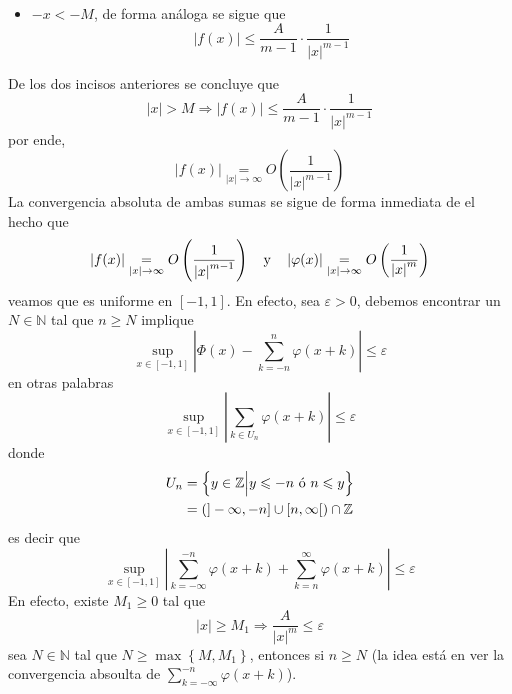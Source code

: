 \documentclass[12pt]{report}
\newcounter{it}
\theoremstyle{largebreak}
\renewcommand{\leq}{\ensuremath{\leqslant}}
\renewcommand{\geq}{\ensuremath{\geqslant}}
\newcommand\abs[1]{\ensuremath{\left|#1\right|}}
\begin{document}
\begin{sol}
\begin{itemize}
\begin{equation*}
\begin{split}
                \end{split}
            \end{equation*}
            \item $-x<-M$, de forma análoga se sigue que
            \begin{equation*}
                \abs{f(x)}\leq \frac{A}{m-1}\cdot\frac{1}{\abs{x}^{m-1}}
            \end{equation*}
        \end{itemize}
        De los dos incisos anteriores se concluye que
        \begin{equation*}
            \abs{x}>M\Rightarrow \abs{f(x)}\leq \frac{A}{m-1}\cdot\frac{1}{\abs{x}^{m-1}}
        \end{equation*}
        por ende,
        \begin{equation*}
            \abs{f(x)}\underset{\abs{x}\rightarrow\infty}{=}O\left(\frac{1}{\abs{x}^{ m-1}} \right)
        \end{equation*}
        La convergencia absoluta de ambas sumas se sigue de forma inmediata de el hecho que
        \begin{equation*}
            \abs{f(x)}\underset{\abs{x}\rightarrow\infty}{=}O\left(\frac{1}{\abs{x}^{ m-1}} \right)\quad\textup{y}\quad\abs{\varphi(x)}\underset{\abs{x}\rightarrow\infty}{=}O\left(\frac{1}{\abs{x}^{ m}} \right)
        \end{equation*}
        veamos que es uniforme en $[-1,1]$. En efecto, sea $\varepsilon>0$, debemos encontrar un $N\in\mathbb{N}$ tal que $n\geq N$ implique
        \begin{equation*}
            \sup_{ x\in[-1,1]}\abs{\Phi(x)-\sum_{ k=-n}^{n}\varphi(x+k)}\leq\varepsilon
        \end{equation*}
        en otras palabras
        \begin{equation*}
            \sup_{ x\in[-1,1]}\abs{\sum_{ k\in U_n}\varphi(x+k)}\leq\varepsilon
        \end{equation*}
        donde
        \begin{equation*}
            \begin{split}
                U_n&=\left\{y\in\mathbb{Z}\Big|y\leq-n\textup{ ó }n\leq y \right\}\\
                &=\left(]-\infty,-n]\cup[n,\infty[\right)\cap\mathbb{Z}\\
            \end{split}
        \end{equation*}
        es decir que
        \begin{equation*}
            \sup_{ x\in[-1,1]}\abs{\sum_{ k=-\infty }^{ -n}\varphi(x+k)+\sum_{ k=n}^{\infty}\varphi(x+k)}\leq\varepsilon
        \end{equation*}
        En efecto, existe $M_1\geq 0$ tal que
        \begin{equation*}
            \abs{x}\geq M_1\Rightarrow \frac{A}{\abs{x}^m}\leq \varepsilon
        \end{equation*}
        sea $N\in\mathbb{N}$ tal que $N\geq\max\left\{M,M_1 \right\}$, entonces si $n\geq N$
        (la idea está en ver la convergencia absoulta de $\sum_{ k=-\infty }^{ -n}\varphi(x+k)$).


\end{sol}
\end{document}
